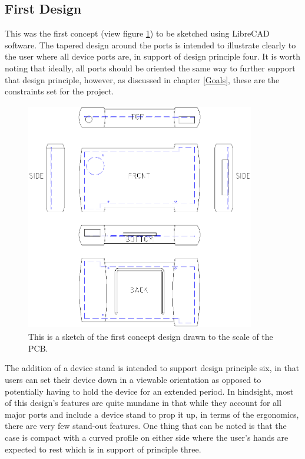\subsection{First Design}

This was the first concept (view figure \ref{fig:Design_1}) to be sketched using LibreCAD software.
The tapered design around the ports is intended to illustrate clearly to the user where all device ports are, in support of design principle four. 
It is worth noting that ideally, all ports should be oriented the same way to further support that design principle, however, as discussed in chapter \ref{Goals}, these are the constraints set for the project.

\begin{figure} [h]
\centering
\includegraphics[width=10cm,height=10cm,keepaspectratio]{Figures/design1_sketch.png}
\caption{This is a sketch of the first concept design drawn to the scale of the PCB.}
\label{fig:Design_1}
\end{figure}

The addition of a device stand is intended to support design principle six, in that users can set their device down in a viewable orientation as opposed to potentially having to hold the device for an extended period.
In hindsight, most of this design’s features are quite mundane in that while they account for all major ports and include a device stand to prop it up, in terms of the ergonomics, there are very few stand-out features. 
One thing that can be noted is that the case is compact with a curved profile on either side where the user’s hands are expected to rest which is in support of principle three.


